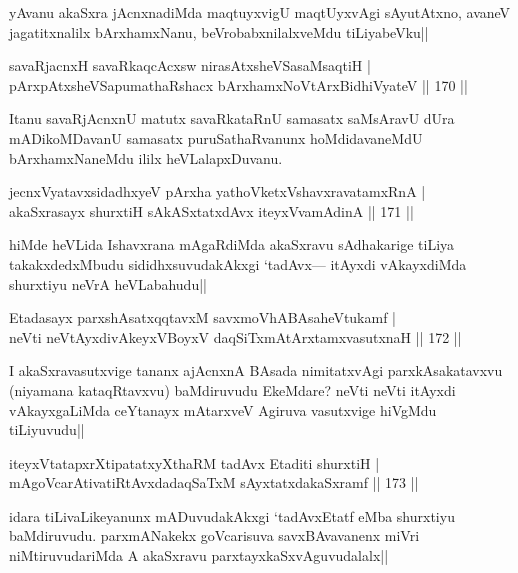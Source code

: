 \begin{artha}
yAvanu akaSxra jAcnxnadiMda maqtuyxvigU maqtUyxvAgi sAyutAtxno, avaneV jagatitxnalilx bArxhamxNanu, beVrobabxnilalxveMdu tiLiyabeVku||
\end{artha}


\begin{shl}
savaRjacnxH savaRkaqcAcxsw nirasAtxsheVSasaMsaqtiH |\\
pArxpAtxsheVSapumathaRshacx bArxhamxNoV\s tArxBidhiVyateV \hfill || 170 ||
\end{shl}

\begin{artha}
Itanu savaRjAcnxnU matutx savaRkataRnU samasatx saMsAravU dUra mADikoMDavanU samasatx puruSathaRvanunx hoMdidavaneMdU bArxhamxNaneMdu ililx heVLalapxDuvanu.
\end{artha}

\begin{shl}
jecnxVyatavxsidadhxyeV pArxha yathoVketxVshavxravatamxRnA |\\
akaSxrasayx shurxtiH sAkASxtatxdAvx iteyxVvamAdinA \hfill || 171 ||
\end{shl}

\begin{artha}
hiMde heVLida Ishavxrana mAgaRdiMda akaSxravu sAdhakarige tiLiya takakxdedxMbudu sididhxsuvudakAkxgi `tadAvx--- itAyxdi vAkayxdiMda shurxtiyu neVrA heVLabahudu||
\end{artha}

\begin{shl}
Etadasayx parxshAsatxqqtavxM savxmoVhABAsaheVtukamf |\\
neVti neVtAyxdivAkeyxVBoyxV daqSiTxmAtArxtamxvasutxnaH \hfill || 172 ||
\end{shl}

\begin{artha}%
I akaSxravasutxvige tananx ajAcnxnA BAsada nimitatxvAgi parxkAsakatavxvu (niyamana kataqRtavxvu) baMdiruvudu EkeMdare? neVti neVti itAyxdi vAkayxgaLiMda ceYtanayx mAtarxveV Agiruva vasutxvige hiVgMdu tiLiyuvudu||
\end{artha}

\begin{shl}
iteyxVtatapxrXtipatatxyXthaRM tadAvx Etaditi shurxtiH |\\
mAgoVcarAtivatiRtAvxdadaqSaTxM sAyxtatxdakaSxramf \hfill || 173 ||
\end{shl}

\begin{artha}
idara tiLivaLikeyanunx mADuvudakAkxgi `tadAvxEtatf eMba shurxtiyu baMdiruvudu. parxmANakekx goVcarisuva savxBAvavanenx miVri niMtiruvudariMda A akaSxravu parxtayxkaSxvAguvudalalx||
\end{artha}

